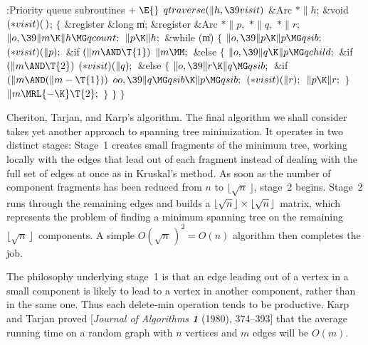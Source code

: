 \Y\B\4:Priority queue subroutines\X${}\mathrel+\E{}$\6
$\\{qtraverse}(\|h,\39\\{visit}){}$\1\1\6
\&{Arc} ${}{*}\|h{}$;\6
\&{void} ${}({*}\\{visit})(\,){}$;\2%
\2\6
${}\{{}$\5
\1\&{register} \&{long} \|m;\6
\&{register} \&{Arc} ${}{*}\|p,{}$ ${}{*}\|q,{}$ ${}{*}\|r{}$;\7
${}\|o,\39\|m\K\|h\MG\\{qcount};{}$\6
${}\|p\K\|h;{}$\6
\&{while} (\|m)\5
${}\{{}$\1\6
${}\|o,\39\|p\K\|p\MG\\{qsib};{}$\6
${}({*}\\{visit})(\|p);{}$\6
\&{if} ${}(\|m\AND\T{1}){}$\1\5
${}\|m\MM;{}$\2\6
\&{else}\5
${}\{{}$\1\6
${}\|o,\39\|q\K\|p\MG\\{qchild};{}$\6
\&{if} ${}(\|m\AND\T{2}){}$\1\5
${}({*}\\{visit})(\|q);{}$\2\6
\&{else}\5
${}\{{}$\1\6
${}\|o,\39\|r\K\|q\MG\\{qsib};{}$\6
\&{if} ${}(\|m\AND(\|m-\T{1})){}$\1\5
${}\\{oo},\39\|q\MG\\{qsib}\K\|p\MG\\{qsib};{}$\2\6
${}({*}\\{visit})(\|r);{}$\6
${}\|p\K\|r;{}$\6
\4${}\}{}$\2\6
${}\|m\MRL{-{\K}}\T{2};{}$\6
\4${}\}{}$\2\6
\4${}\}{}$\2\6
\4${}\}{}$\2\par
\fi

Cheriton, Tarjan, and Karp's algorithm.
\def\lsqrtn{\hbox{$\lfloor\sqrt n\,\rfloor$}}%
\def\usqrtn{\hbox{$\lfloor\sqrt{n+1}+{1\over2}\rfloor$}}%
The final algorithm we shall consider takes yet another approach to
spanning tree minimization. It operates in two distinct stages: Stage~1
creates small fragments of the minimum tree, working locally with the
edges that lead out of each fragment instead of dealing with the
full set of edges at once as in Kruskal's method. As soon as the
number of component fragments has been reduced from $n$ to \lsqrtn,
stage~2 begins. Stage~2 runs through the remaining edges and builds a
$\lsqrtn\times\lsqrtn$ matrix, which represents the problem of
finding a minimum spanning tree on the remaining \lsqrtn\ components.
A simple $O(\sqrt n\,)^2=O(n)$ algorithm then completes the job.

The philosophy underlying stage~1 is that an edge leading out of a
vertex in a small component is likely to lead to a vertex in another
component, rather than in the same one. Thus each delete-min operation
tends to be productive. Karp and Tarjan proved [{\sl Journal of Algorithms\/
\bf1} (1980), 374--393] that the average running time on a random graph with
$n$ vertices and $m$ edges will be $O(m)$.

